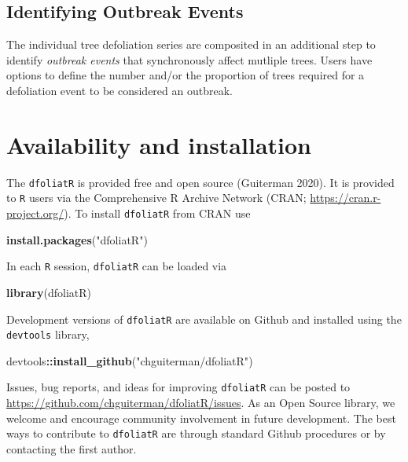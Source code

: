 \documentclass[review]{elsarticle} %
\newenvironment{Shaded}{\begin{snugshade}}{\end{snugshade}}
\newcommand{\KeywordTok}[1]{\textcolor[rgb]{0.13,0.29,0.53}{\textbf{#1}}}
\newcommand{\NormalTok}[1]{#1}
\newcommand{\OperatorTok}[1]{\textcolor[rgb]{0.81,0.36,0.00}{\textbf{#1}}}
\newcommand{\StringTok}[1]{\textcolor[rgb]{0.31,0.60,0.02}{#1}}
\begin{document}
\hypertarget{identifying-outbreak-events}{%
\subsection{Identifying Outbreak
Events}\label{identifying-outbreak-events}}

The individual tree defoliation series are composited in an additional
step to identify \emph{outbreak events} that synchronously affect
mutliple trees. Users have options to define the number and/or the
proportion of trees required for a defoliation event to be considered an
outbreak.

\hypertarget{availability-and-installation}{%
\section{Availability and
installation}\label{availability-and-installation}}

The \texttt{dfoliatR} is provided free and open source (Guiterman 2020).
It is provided to \texttt{R} users via the Comprehensive R Archive
Network (CRAN; \url{https://cran.r-project.org/}). To install
\texttt{dfoliatR} from CRAN use

\begin{Shaded}
\begin{Highlighting}[]
\KeywordTok{install.packages}\NormalTok{(}\StringTok{"dfoliatR"}\NormalTok{)}
\end{Highlighting}
\end{Shaded}

In each \texttt{R} session, \texttt{dfoliatR} can be loaded via

\begin{Shaded}
\begin{Highlighting}[]
\KeywordTok{library}\NormalTok{(dfoliatR)}
\end{Highlighting}
\end{Shaded}

Development versions of \texttt{dfoliatR} are available on Github and
installed using the \texttt{devtools} library,

\begin{Shaded}
\begin{Highlighting}[]
\NormalTok{devtools}\OperatorTok{::}\KeywordTok{install_github}\NormalTok{(}\StringTok{"chguiterman/dfoliatR"}\NormalTok{)}
\end{Highlighting}
\end{Shaded}

Issues, bug reports, and ideas for improving \texttt{dfoliatR} can be
posted to \url{https://github.com/chguiterman/dfoliatR/issues}. As an
Open Source library, we welcome and encourage community involvement in
future development. The best ways to contribute to \texttt{dfoliatR} are
through standard Github procedures or by contacting the first author.
\end{document}
